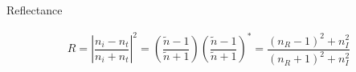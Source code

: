 Reflectance

\begin{equation*}
  \begin{aligned}
    R = \left| \dfrac{n_i - n_t}{n_i + n_t}  \right|^2 = \left( \dfrac{\tilde{n} - 1}{\tilde{n} + 1}  \right) \left( \dfrac{\tilde{n} - 1}{\tilde{n} + 1}  \right)^{*} = \dfrac{\left( n_R - 1 \right)^2 + n_I^2}{\left( n_R + 1 \right)^2 + n_I^2} 
  \end{aligned}
\end{equation*}




